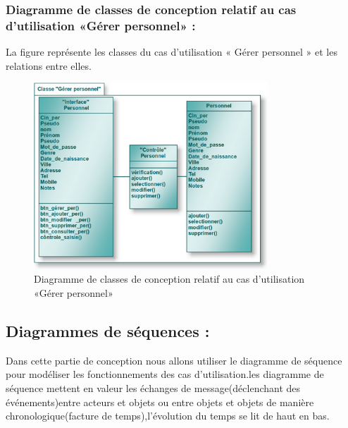 \documentclass[12 pt]{report}
\begin{document}
\subsubsection{Diagramme de classes de conception relatif au cas d’utilisation «Gérer personnel» :}
La figure  représente les classes du cas d’utilisation « Gérer personnel » et les relations entre elles.
\begin{figure}[h]
 \begin{center}
\includegraphics[width= 11 cm ,height=  7cm]{cl_gp.PNG}
\caption{Diagramme de classes de conception relatif au cas d’utilisation «Gérer personnel» }

\end{center}
\end{figure}



\subsection{Diagrammes de séquences :}
Dans cette partie de conception nous allons utiliser le diagramme de séquence pour modéliser les fonctionnements des cas d'utilisation.les diagramme de séquence mettent en valeur les échanges de message(déclenchant des événements)entre acteurs et objets ou entre objets et objets de manière chronologique(facture de temps),l'évolution du temps se lit de haut en bas.
\newpage
\end{document}
